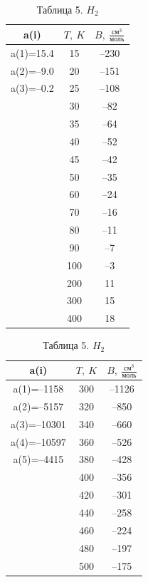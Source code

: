 \documentclass[a4paper]{article}
\numberwithin{equation}{subsection} %
\begin{document}
\begin{table}[ht!]
\centering

\begin{minipage}{0.32\linewidth}
\centering
\begin{tabular}{|c|c|c|}
\hline
a(i) & $T,\ K$ & $B,\ \frac{\text{см}^3}{\text{моль}}$ \\
\hline
a(1)=15.4 & 15 & –230 \\
a(2)=–9.0 & 20 & –151 \\
a(3)=–0.2 & 25 & –108 \\
          & 30 & –82 \\
          & 35 & –64 \\
          & 40 & –52 \\
          & 45 & –42 \\
          & 50 & –35 \\
          & 60 & –24 \\
          & 70 & –16 \\
          & 80 & –11 \\
          & 90 & –7 \\
          & 100 & –3 \\
          & 200 & 11 \\
          & 300 & 15 \\
          & 400 & 18 \\
\hline
\end{tabular}
\caption{Таблица 5. $H_2$}
\label{tab:h2}
\end{minipage}
\hfill
\begin{minipage}{0.32\linewidth}
\centering
\begin{tabular}{|c|c|c|}
\hline
a(i) & $T,\ K$ & $B,\ \frac{\text{см}^3}{\text{моль}}$ \\
\hline
a(1)=–1158 & 300 & –1126 \\
a(2)=–5157 & 320 & –850 \\
a(3)=–10301 & 340 & –660 \\
a(4)=–10597 & 360 & –526 \\
a(5)=–4415 & 380 & –428 \\
           & 400 & –356 \\
           & 420 & –301 \\
           & 440 & –258 \\
           & 460 & –224 \\
           & 480 & –197 \\
           & 500 & –175 \\

\end{tabular}
\end{minipage}
\end{table}
\end{document}
